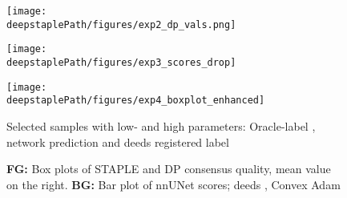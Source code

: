     \begin{figure}
        \centering
        \begin{minipage}[b]{0.31\textwidth}
            \centering
            \texttt{[image: \\deepstaplePath/figures/exp2\_dp\_vals.png]}
        \end{minipage}
        \hfill
        \begin{minipage}[b]{0.31\textwidth}
            \centering
            \texttt{[image: \\deepstaplePath/figures/exp3\_scores\_drop]}
        \end{minipage}
        \hfill
        \begin{minipage}[b]{0.33\textwidth}
            \centering
            \texttt{[image: \\deepstaplePath/figures/exp4\_boxplot\_enhanced]}
        \end{minipage}
        \par
        \begin{minipage}{0.31\linewidth}
            \caption{Selected samples with low- and high parameters: Oracle-label , network prediction  and deeds registered label } \label{fig:epx2_dp_vals}
        \end{minipage}
        \hfill
        \begin{minipage}{0.31\linewidth}
            \caption{%
                Inline  and out-of-line  backpropagation. Validation Dice (\sampleline{}) and Spearman-corr. of params. and oracle-Dice ()%
            } \label{fig:exp3_scores_drop}
        \end{minipage}
        \hfill
        \begin{minipage}{0.33\linewidth}
            \caption{\textbf{FG:} Box plots of STAPLE and DP consensus quality, mean value on the right. \textbf{BG:} Bar plot of nnUNet scores; deeds , Convex Adam }
            \label{fig:exp4_boxplot}
        \end{minipage}
        \vspace{-12pt}
    \end{figure}

    \vspace{-7pt}
